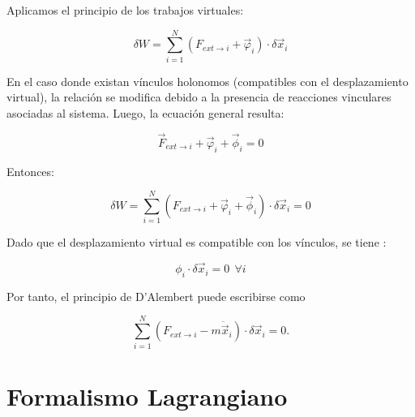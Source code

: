 \documentclass[12pt]{report}
\begin{document}
Aplicamos el principio de los trabajos virtuales:

\begin{equation}
\delta W=\sum_{i=1}^N \left( F_{ext \rightarrow i} + \vec{\varphi}_i  \right) \cdot \delta \vec{x}_i
\end{equation}

En el caso donde existan vínculos holonomos (compatibles con el desplazamiento virtual), la relación se modifica debido a la presencia de reacciones vinculares asociadas al sistema. Luego, la ecuación general resulta:

\begin{equation}
\vec{F}_{ext \rightarrow i} + \vec{\varphi}_i + \vec{\phi}_i =0
\end{equation} 


Entonces:


\begin{equation}
\delta W=\sum_{i=1}^N \left( F_{ext \rightarrow i} + \vec{\varphi}_i  + \vec{\phi}_i \right) \cdot \delta \vec{x}_i = 0
\end{equation}

Dado que el desplazamiento virtual es compatible con los vínculos, se tiene :

\begin{equation}
\phi_i \cdot \delta \vec{x}_i = 0 \ \ \forall i
\end{equation}


Por tanto, el principio de D’Alembert puede escribirse como 

\begin{equation}
\sum_{i=1}^N \left( F_{ext \rightarrow i} - m \ddot{\vec{x}}_i \right) \cdot \delta \vec{x}_i = 0.
\end{equation}

































\chapter{Formalismo Lagrangiano} 
\end{document}

